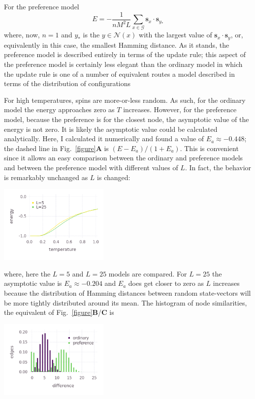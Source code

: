 \documentclass[letterpaper]{article}
\begin{document}
For the preference model
\begin{equation}    
    E=-\frac{1}{nM^2L}\sum_{x\in \mathcal{G}}\textbf{s}_x\cdot\textbf{s}_{y_*}    
\end{equation}
where, now, $n=1$ and $y_*$ is the $y\in\mathcal{N}(x)$ with the largest value of $\textbf{s}_x\cdot\textbf{s}_y$, or, equivalently in this case, the smallest Hamming distance. As it stands, the preference model is described entirely in terms of the update rule; this aspect of the preference model is certainly less elegant than the ordinary model in which the update rule is one of a number of equivalent routes a model described in terms of the distribution of configurations

For high temperatures, spins are more-or-less random. As such, for the ordinary model the energy approaches zero as $T$ increases. However, for the preference model, because the preference is for the closest node, the asymptotic value of the energy is not zero. It is likely the asymptotic value could be calculated analytically. Here, I calculated it numerically and found a value of $E_a\approx -0.448$; the dashed line in Fig.~\ref{figure}\textbf{A} is $(E-E_a)/(1+E_a)$. This is convenient since it allows an easy comparison between the ordinary and preference models and between the preference model with different values of $L$. In fact, the behavior is remarkably unchanged as $L$ is changed: 
\begin{center}
\includegraphics[height=1.5in]{energy_l25.png}
\end{center}
where, here the $L=5$ and $L=25$ models are compared. For $L=25$ the asymptotic value is $E_a\approx -0.204$ and $E_a$ does get closer to zero as $L$ increases because the distribution of Hamming distances between random state-vectors will be more tightly distributed around its mean. The histogram of node similarities, the equivalent of Fig.~\ref{figure}\textbf{B}/\textbf{C} is
\begin{center}
\includegraphics[height=1.5in]{l25_hist.png}
\end{center}
\end{document}
